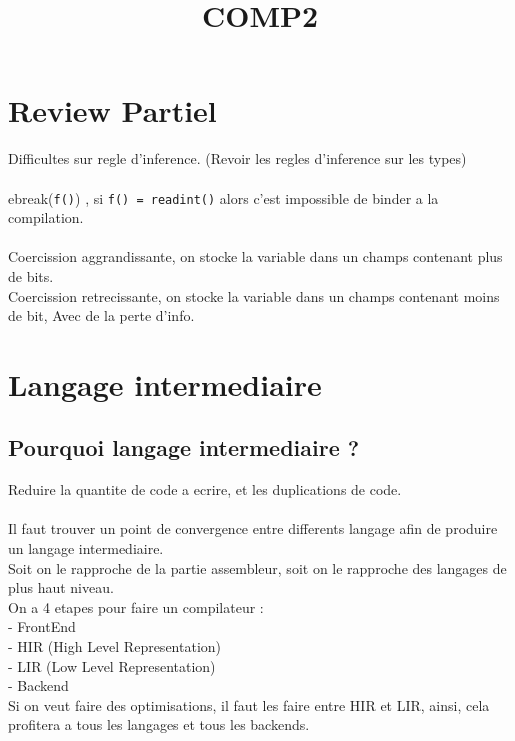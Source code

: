 \documentclass[a4paper,11pt]{article}
\title{COMP2}
\author{}
\begin{document}
\maketitle
\tableofcontents
\newpage

\section*{Review Partiel}

Difficultes sur regle d'inference. (Revoir les regles d'inference sur les types)\\\\
ebreak(\texttt{f()}) , si \texttt{f() = readint()} alors c'est impossible de binder  a la compilation.\\\\
Coercission  aggrandissante, on stocke la variable dans un champs contenant plus de bits.\\
Coercission retrecissante, on stocke la variable dans un champs contenant moins de bit, Avec de la perte d'info.

\section{Langage intermediaire}

\subsection{Pourquoi langage intermediaire ?}
Reduire la quantite de code a ecrire, et les duplications de code.\\\\
Il faut trouver un point de convergence entre differents langage afin de produire  un langage intermediaire.\\
Soit on le rapproche de la partie assembleur, soit on le rapproche des langages de plus haut niveau.\\

On a 4 etapes pour faire un compilateur :\\
- FrontEnd\\
- HIR (High Level Representation)\\
- LIR (Low Level Representation)\\
- Backend\\

Si on veut faire des optimisations, il faut les faire entre HIR et LIR, ainsi, cela profitera a tous les langages et tous les backends.\\
\end{document}
